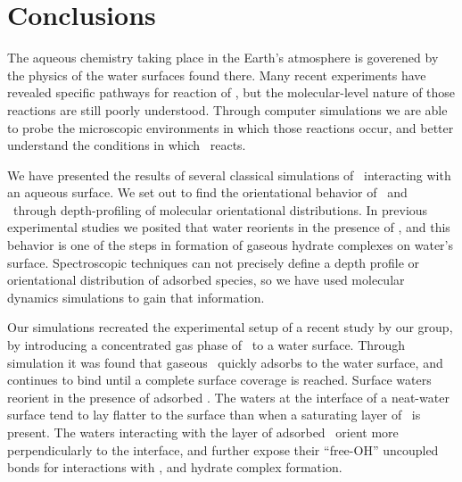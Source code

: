 \section {Conclusions}

The aqueous chemistry taking place in the Earth's atmosphere is goverened by the physics of the water surfaces found there. Many recent experiments have revealed specific pathways for reaction of \suldiox, but the molecular-level nature of those reactions are still poorly understood. Through computer simulations we are able to probe the microscopic environments in which those reactions occur, and better understand the conditions in which \suldiox~reacts.

We have presented the results of several classical simulations of \suldiox~interacting with an aqueous surface. We set out to find the orientational behavior of \wat~and \suldiox~through depth-profiling of molecular orientational distributions. In previous experimental studies we posited that water reorients in the presence of \suldiox, and this behavior is one of the steps in formation of gaseous hydrate complexes on water's surface. Spectroscopic techniques can not precisely define a depth profile or orientational distribution of adsorbed species, so we have used molecular dynamics simulations to gain that information.

Our simulations recreated the experimental setup of a recent study by our group,\cite{Ota2011} by introducing a concentrated gas phase of \suldiox~to a water surface. Through simulation it was found that gaseous \suldiox~quickly adsorbs to the water surface, and continues to bind until a complete surface coverage is reached. Surface waters reorient in the presence of adsorbed \suldiox. The waters at the interface of a neat-water surface tend to lay flatter to the surface than when a saturating layer of \suldiox~is present. The waters interacting with the layer of adsorbed \suldiox~orient more perpendicularly to the interface, and further expose their ``free-OH'' uncoupled bonds for interactions with \suldiox, and hydrate complex formation.

